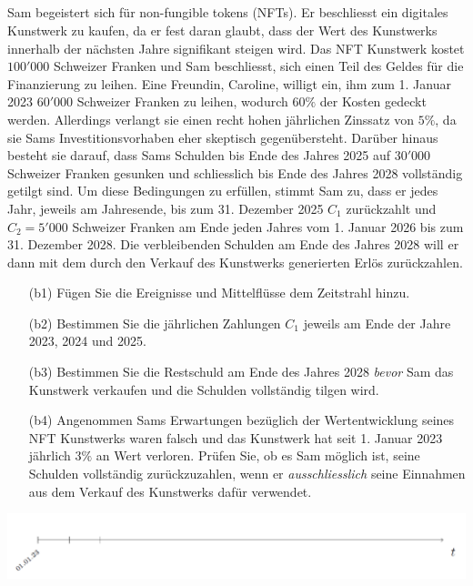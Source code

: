 \subsection*{}
Sam begeistert sich für non-fungible tokens (NFTs).
Er beschliesst ein digitales Kunstwerk zu kaufen, da er fest daran glaubt, dass der Wert des Kunstwerks innerhalb der nächsten Jahre signifikant steigen wird. 
Das NFT Kunstwerk kostet $100'000$ Schweizer Franken und Sam
beschliesst, sich einen Teil des Geldes für die Finanzierung zu leihen.
Eine Freundin, Caroline, willigt ein, ihm zum 1. Januar 2023 $60'000$
Schweizer Franken zu leihen, wodurch $60 \% $ der Kosten gedeckt werden.
Allerdings verlangt sie einen recht hohen jährlichen Zinssatz
von $5 \%$, da sie Sams Investitionsvorhaben eher skeptisch gegenübersteht.
Darüber hinaus besteht sie darauf, dass Sams Schulden bis Ende des Jahres 2025 auf
$30'000$ Schweizer Franken gesunken und schliesslich bis Ende des Jahres 2028 vollständig getilgt sind.
Um diese Bedingungen zu erfüllen, stimmt Sam zu, dass er jedes Jahr, jeweils am Jahresende, bis zum 31. Dezember 2025 $C_1$ zurückzahlt und $C_2 = 5'000$ Schweizer Franken am Ende jeden Jahres vom 1. Januar 2026 bis zum 31. Dezember 2028.
Die verbleibenden Schulden am Ende des Jahres 2028 will er dann mit dem durch den Verkauf des Kunstwerks generierten
Erlös zurückzahlen.
\begin{enumerate}
	\item[(b1)] Fügen Sie die Ereignisse und Mittelflüsse dem Zeitstrahl hinzu.
	\item[(b2)] Bestimmen Sie die jährlichen Zahlungen $C_1$ jeweils am Ende der Jahre 2023, 2024 und 2025.
	\item[(b3)] Bestimmen Sie die Restschuld am Ende des Jahres 2028 \textit{bevor} Sam das Kunstwerk verkaufen und die Schulden vollständig tilgen wird.
	\item[(b4)] Angenommen Sams Erwartungen bezüglich der Wertentwicklung seines NFT Kunstwerks waren falsch und das Kunstwerk hat seit 1. Januar 2023 jährlich $3 \%$ an Wert verloren. Prüfen Sie, ob es Sam möglich ist, seine Schulden vollständig zurückzuzahlen, wenn er \textit{ausschliesslich} seine Einnahmen aus dem Verkauf des Kunstwerks dafür verwendet.
\end{enumerate}
\begin{center}
	\includegraphics[scale=0.45]{pictures/zeitstrahl_1_b}
\end{center}
\newpage
